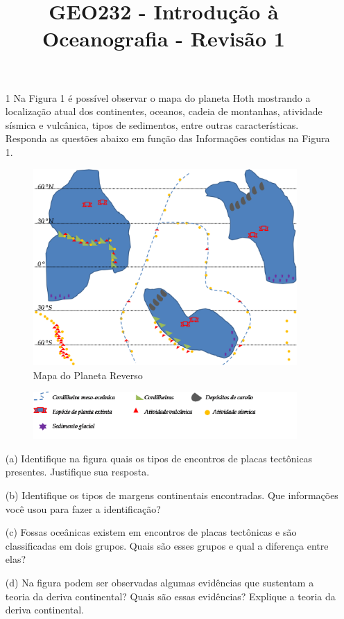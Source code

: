\documentclass[a4paper,10pt]{article}
\title{GEO232 - Introdução à Oceanografia - Revisão 1}
\author{\vspace{-10ex}}
\date{\vspace{-10ex}}
\begin{document}
 \maketitle
 \phantom{}


\begin{itemize}
  \item[1] Na Figura 1 é possível observar o mapa do planeta Hoth mostrando a localização atual dos continentes, oceanos, cadeia de montanhas, atividade sísmica e vulcânica, tipos de sedimentos, entre outras características.  
  Responda as questões abaixo em função das Informações contidas na Figura 1.
   
   \begin{figure}[h!]
  \centering
    \includegraphics[width=0.95\textwidth]{DerivaContinental}
  \caption{Mapa do Planeta Reverso}
\end{figure}
   \begin{figure}[h!]
  \centering
    \includegraphics[width=0.95\textwidth]{Legenda}
 \end{figure}
   
  \item[(a)] Identifique na figura quais os tipos de encontros de placas tectônicas presentes. Justifique sua resposta.
  \item[(b)] Identifique os tipos de margens continentais encontradas. Que informações você usou para fazer a identificação?
  \item[(c)] Fossas oceânicas existem em encontros de placas tectônicas e são classificadas em dois grupos. Quais são esses grupos e qual a diferença entre elas?
  \item[(d)] Na figura podem ser observadas algumas evidências que sustentam a teoria da deriva continental? Quais são essas evidências? Explique a teoria da deriva continental. 


\end{itemize}
\end{document}
